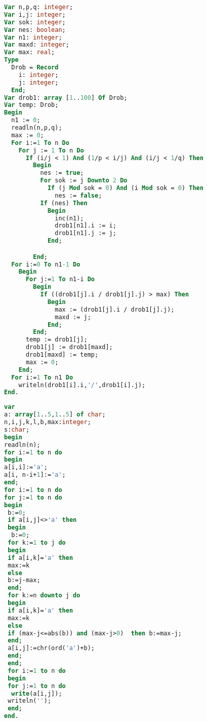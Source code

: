 \begin{algorithm}[!h] 
\caption{Исправленное решение из листинга~\ref{lstB3:apx}, которое проходит все тесты}\label{lstB4:apx} 
\begin{lstlisting}[language=pascal, basicstyle=\small]
Var n,p,q: integer;
Var i,j: integer;
Var sok: integer;
Var nes: boolean;
Var n1: integer;
Var maxd: integer;
Var max: real;
Type 
  Drob = Record
    i: integer;
    j: integer;
  End;
Var drob1: array [1..100] Of Drob;
Var temp: Drob;
Begin
  n1 := 0;
  readln(n,p,q);
  max := 0;
  For i:=1 To n Do
    For j := 1 To n Do
      If (i/j < 1) And (1/p < i/j) And (i/j < 1/q) Then
        Begin
          nes := true;
          For sok := j Downto 2 Do
            If (j Mod sok = 0) And (i Mod sok = 0) Then
              nes := false;
          If (nes) Then
            Begin
              inc(n1);
              drob1[n1].i := i;
              drob1[n1].j := j;
            End;

        End;
  For i:=0 To n1-1 Do
    Begin
      For j:=1 To n1-i Do
        Begin
          If ((drob1[j].i / drob1[j].j) > max) Then
            Begin
              max := (drob1[j].i / drob1[j].j);
              maxd := j;
            End;
        End;
      temp := drob1[j];
      drob1[j] := drob1[maxd];
      drob1[maxd] := temp;
      max := 0;
    End;
  For i:=1 To n1 Do
    writeln(drob1[i].i,'/',drob1[i].j);
End.
\end{lstlisting} 
\end{algorithm}




\begin{algorithm}[!h] 
\caption{Решение задачи \textbf{С} с вердиктом <<Неправильный ответ $6$>>}\label{lstB5:apx} 
\begin{lstlisting}[basicstyle=\small, language=pascal]
var
a: array[1..5,1..5] of char;
n,i,j,k,l,b,max:integer;
s:char;
begin
readln(n);
for i:=1 to n do
begin
a[i,i]:='a';
a[i, n-i+1]:='a';
end;
for i:=1 to n do
for j:=1 to n do
begin
 b:=0;
 if a[i,j]<>'a' then
 begin
  b:=0;
 for k:=1 to j do
 begin
 if a[i,k]='a' then
 max:=k
 else
 b:=j-max;
 end;
 for k:=n downto j do
 begin
 if a[i,k]='a' then
 max:=k
 else
 if (max-j<=abs(b)) and (max-j>0)  then b:=max-j;
 end;
 a[i,j]:=chr(ord('a')+b);
 end;
 end;
 for i:=1 to n do
 begin
 for j:=1 to n do
  write(a[i,j]);
 writeln('');
 end;
end.
\end{lstlisting} 
\end{algorithm}

